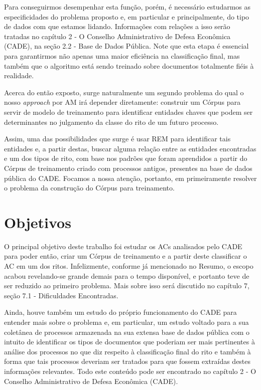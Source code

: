 \documentclass[11pt]{report}
\begin{document}
Para conseguirmos desempenhar esta função, porém, é necessário estudarmos as especificidades do problema proposto e, em particular e principalmente,
do tipo de dados com que estamos lidando. Informações com relações a isso serão tratadas no capítulo 2 - O Conselho Administrativo de Defesa Econômica (CADE), na seção 2.2 - Base de Dados Pública.
Note que esta etapa é essencial para garantirmos não apenas uma maior eficiência na classificação final, mas também que o algoritmo está sendo treinado sobre
documentos totalmente fiéis à realidade.

Acerca do então exposto, surge naturalmente um segundo problema do qual o nosso \textit{approach} por AM irá depender diretamente: construir um Córpus para servir de modelo de
treinamento para identificar entidades chaves que podem ser determinantes no julgamento da classe do rito de um futuro processo.

Assim, uma das possibilidades que surge é usar REM para identificar tais entidades e, a partir destas, buscar alguma relação entre as entidades encontradas e um dos tipos de rito, com
base nos padrões que foram aprendidos a partir do Córpus de treinamento criado com processos antigos, presentes na base de dados pública do CADE. Focamos
a nossa atenção, portanto, em primeiramente resolver o problema da construção do Córpus para treinamento.

\section{Objetivos}

\indent\indent O principal objetivo deste trabalho foi estudar os ACs analisados pelo CADE para poder então, criar um Córpus de treinamento e a partir deste classificar
o AC em um dos ritos. Infelizmente, conforme já mencionado no Resumo, o escopo acabou revelando-se grande demais para o tempo disponível, e portanto teve de ser reduzido
ao primeiro problema. Mais sobre isso será discutido no capítulo 7, seção 7.1 - Dificuldades Encontradas.

Ainda, houve também um estudo do próprio funcionamento do CADE para entender mais sobre o problema e, em particular, um estudo voltado para a sua coletânea de processos
armazenada na sua extensa base de dados pública com o intuito de identificar os tipos de documentos que poderiam ser mais pertinentes à análise dos processos no que diz respeito
à classificação final do rito e também à forma que tais processos deveriam ser tratados para que fossem extraídas destes informações relevantes. Todo este conteúdo pode ser encontrado no
capítulo 2 - O Conselho Administrativo de Defesa Econômica (CADE).
\end{document}

